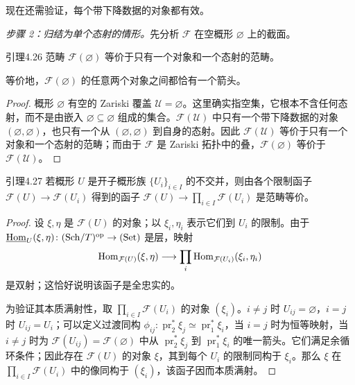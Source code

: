 现在还需验证，每个带下降数据的对象都有效。

\emph{步骤 2：归结为单个态射的情形。}先分析 $\mathcal F$ 在空概形 $\varnothing$ 上的截面。

\begin{origstatement}{引理}{4.26}\label{ch04:lem426}
范畴 $\mathcal F(\varnothing)$ 等价于只有一个对象和一个态射的范畴。
\end{origstatement}
等价地，$\mathcal F(\varnothing)$ 的任意两个对象之间都恰有一个箭头。
\begin{proof}
概形 $\varnothing$ 有空的 Zariski 覆盖 $\mathcal U=\varnothing$。这里确实指空集，它根本不含任何态射，而不是由嵌入 $\varnothing\subseteq\varnothing$ 组成的集合。$\mathcal F(\mathcal U)$ 中只有一个带下降数据的对象 $(\varnothing,\varnothing)$，也只有一个从 $(\varnothing,\varnothing)$ 到自身的态射。因此 $\mathcal F(\mathcal U)$ 等价于只有一个对象和一个态射的范畴；而由于 $\mathcal F$ 是 Zariski 拓扑中的叠，$\mathcal F(\varnothing)$ 等价于 $\mathcal F(\mathcal U)$。
\end{proof}

\begin{origstatement}{引理}{4.27}\label{ch04:lem427}
若概形 $U$ 是开子概形族 $\{U_i\}_{i\in I}$ 的不交并，则由各个限制函子 $\mathcal F(U)\to\mathcal F(U_i)$ 得到的函子
$\mathcal F(U)\to\prod_{i\in I}\mathcal F(U_i)$ 是范畴等价。
\end{origstatement}
\begin{proof}
设 $\xi,\eta$ 是 $\mathcal F(U)$ 的对象；以 $\xi_i,\eta_i$ 表示它们到 $U_i$ 的限制。由于 $\underline{\operatorname{Hom}}_U(\xi,\eta)\colon(\mathrm{Sch}/T)^{\mathrm{op}}\to(\mathrm{Set})$ 是层，映射
\[
 \operatorname{Hom}_{\mathcal F(U)}(\xi,\eta)\longrightarrow
 \prod_i\operatorname{Hom}_{\mathcal F(U_i)}(\xi_i,\eta_i)
\]
是双射；这恰好说明该函子是全忠实的。

为验证其本质满射性，取 $\prod_{i\in I}\mathcal F(U_i)$ 的对象 $(\xi_i)$。$i\ne j$ 时 $U_{ij}=\varnothing$，$i=j$ 时 $U_{ij}=U_i$；可以定义过渡同构 $\phi_{ij}\colon\operatorname{pr}_2^*\xi_j\simeq\operatorname{pr}_1^*\xi_i$，当 $i=j$ 时为恒等映射，当 $i\ne j$ 时为 $\mathcal F(U_{ij})=\mathcal F(\varnothing)$ 中从 $\operatorname{pr}_2^*\xi_j$ 到 $\operatorname{pr}_1^*\xi_i$ 的唯一箭头。它们满足余循环条件；因此存在 $\mathcal F(U)$ 的对象 $\xi$，其到每个 $U_i$ 的限制同构于 $\xi_i$。那么 $\xi$ 在 $\prod_{i\in I}\mathcal F(U_i)$ 中的像同构于 $(\xi_i)$，该函子因而本质满射。
\end{proof}

